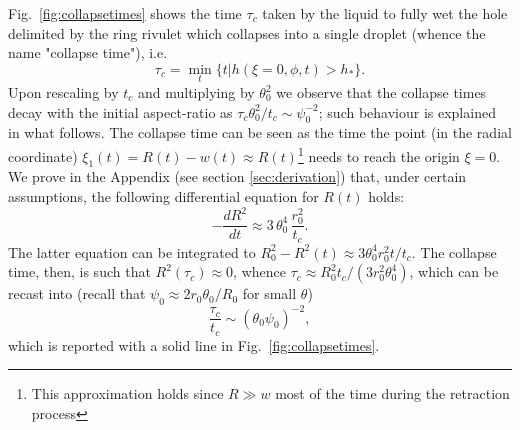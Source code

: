\documentclass[twoside,twocolumn,9pt]{article}
\begin{document}
Fig.~\ref{fig:collapsetimes} shows the time $\tau_c$ taken by the liquid to fully wet the hole delimited by the ring rivulet which collapses into a single droplet (whence the name "collapse time"), i.e. 
\begin{equation}\label{eq:collapsetime}
\tau_c = \min_t \{t | h(\xi=0,\phi,t) > h_{\ast}\}.
\end{equation}
Upon rescaling by $t_c$ and multiplying by $\theta_0^2$ we observe that the collapse times 
decay with the initial aspect-ratio as $\tau_c \theta_0^2/t_c \sim \psi_0^{-2}$; such behaviour is explained in what follows.
The collapse time can be seen as the time the point (in the radial coordinate) $\xi_1(t) = R(t) - w(t) \approx R(t)$\footnote{This approximation holds since $R \gg w$ most of the time during the retraction process} needs to reach the origin $\xi = 0$. 
We prove in the Appendix (see section \ref{sec:derivation}) that, under certain assumptions, the 
following differential equation for $R(t)$ holds:
\begin{equation}\label{eq:modelC4}
-\frac{d R^2}{dt} \approx 3 \, \theta_0^4 \, \frac{r_0^2}{t_c}.
\end{equation}
The latter equation can be integrated to $R_0^2 - R^2(t) \approx 3 \theta_0^4 r_0^2 t/t_c$.
The collapse time, then, is such that $R^2(\tau_c) \approx 0$, whence 
$\tau_c  \approx R_0^2 t_c/(3 r_0^2 \theta_0^4)$, which can be recast into 
(recall that $\psi_0 \approx 2 r_0 \theta_0/R_0$ for small $\theta$) 
\begin{equation}\label{eq:modeltauc}
\frac{\tau_c}{t_c} \sim  (\theta_0 \psi_0)^{-2},
\end{equation}
which is reported with a solid line in Fig.~\ref{fig:collapsetimes}.
\end{document}
